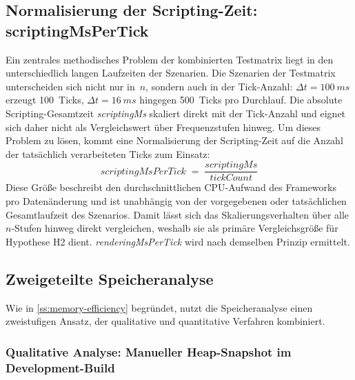 \subsection{Normalisierung der Scripting-Zeit: scriptingMsPerTick}
\label{ss:normalization}

Ein zentrales methodisches Problem der kombinierten Testmatrix liegt in den unterschiedlich langen Laufzeiten der Szenarien. Die Szenarien der Testmatrix unterscheiden sich nicht nur in~$n$, sondern auch in der Tick-Anzahl: $\Delta t = \qty{100}{ms}$ erzeugt 100~Ticks, $\Delta t = \qty{16}{ms}$ hingegen 500~Ticks pro Durchlauf. Die absolute Scripting-Gesamtzeit \textit{scriptingMs} skaliert direkt mit der Tick-Anzahl und eignet sich daher nicht als Vergleichswert über Frequenzstufen hinweg. Um dieses Problem zu lösen, kommt eine Normalisierung der Scripting-Zeit auf die Anzahl der tatsächlich verarbeiteten Ticks zum Einsatz:
\begin{equation}
	\textit{scriptingMsPerTick} \;=\; \frac{\textit{scriptingMs}}{\textit{tickCount}}
\end{equation}
Diese Größe beschreibt den durchschnittlichen CPU-Aufwand des Frameworks pro Datenänderung und ist unabhängig von der vorgegebenen oder tatsächlichen Gesamtlaufzeit des Szenarios. Damit lässt sich das Skalierungsverhalten über alle $n$-Stufen hinweg direkt vergleichen, weshalb sie als primäre Vergleichsgröße für Hypothese H2 dient. \textit{renderingMsPerTick} wird nach demselben Prinzip ermittelt.

\subsection{Zweigeteilte Speicheranalyse}
\label{ss:memory-measurement}

Wie in \cref{ss:memory-efficiency} begründet, nutzt die Speicheranalyse einen zweistufigen Ansatz, der qualitative und quantitative Verfahren kombiniert.

\subsubsection{Qualitative Analyse: Manueller Heap-Snapshot im Development-Build}
\label{sss:qualitative-heap}

